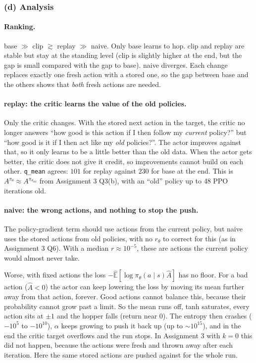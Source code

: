 \documentclass[11pt]{article}
\newcommand{\Ahat}{\hat{A}}
\newcommand{\Ehat}{\hat{\mathbb{E}}}
\newcommand{\code}[1]{\texttt{#1}}
\begin{document}
\subsubsection*{(d) Analysis}
\paragraph{Ranking.} base $\gg$ clip $\gtrsim$ replay $\gg$ naive. Only base learns to hop. clip and replay are stable
but stay at the standing level (clip is slightly higher at the end, but the gap is small compared with the
gap to base). naive diverges. Each change replaces exactly one fresh action with a stored one, so the
gap between base and the others shows that \emph{both} fresh actions are needed.

\paragraph{replay: the critic learns the value of the old policies.}
Only the critic changes. With the stored next action in the target, the critic no longer answers ``how good
is this action if I then follow my \emph{current} policy?'' but ``how good is it if I then act like my
\emph{old} policies?''. The actor improves against that, so it only learns to be a little better than the old
data. When the actor gets better, the critic does not give it credit, so improvements cannot build on each
other. \code{q\_mean} agrees: $101$ for replay against $230$ for base at the end. This is
$A^{\pi_\theta}\approx A^{\pi_{\theta_{\mathrm{old}}}}$ from Assignment 3 Q3(b), with an ``old'' policy up to 48
PPO iterations old.

\paragraph{naive: the wrong actions, and nothing to stop the push.}
The policy-gradient term should use actions from the current policy, but naive uses the stored actions from
old policies, with no $r_\theta$ to correct for this (as in Assignment 3 Q6). With a median $r\approx10^{-5}$,
these are actions the current policy would almost never take.

Worse, with fixed actions the loss $-\Ehat[\log\pi_\theta(a\mid s)\Ahat]$ has no floor. For a bad action
($\Ahat<0$) the actor can keep lowering the loss by moving its mean further away from that action, forever.
Good actions cannot balance this, because their probability cannot grow past a limit. So the mean runs off,
tanh saturates, every action sits at $\pm1$ and the hopper falls (return near 0). The entropy then crashes
($-10^5$ to $-10^{10}$), $\alpha$ keeps growing to push it back up (up to $\sim10^{15}$), and in the end the
critic target overflows and the run stops. In Assignment 3 with $k=0$ this did not happen, because the actions
were fresh and thrown away after each iteration. Here the same stored actions are pushed against for the whole run.
\end{document}
